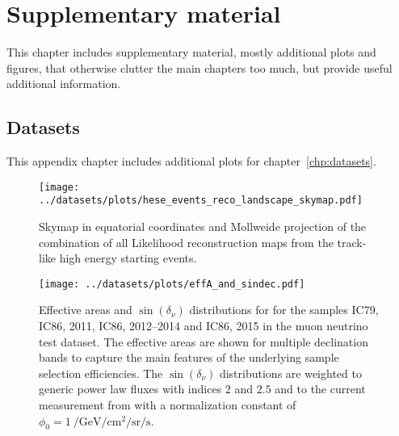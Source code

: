 \chapter{Supplementary material}
This chapter includes supplementary material, mostly additional plots and figures, that otherwise clutter the main chapters too much, but provide useful additional information.


\section{Datasets}
This appendix chapter includes additional plots for chapter~\ref{chp:datasets}.

\begin{figure}[H]
  \centering
  \texttt{[image: ../datasets/plots/hese\_events\_reco\_landscape\_skymap.pdf]}
  \caption[Combined Likelihood skymap of the 22 HESEs]{
    Skymap in equatorial coordinates and Mollweide projection of the combination of all Likelihood reconstruction maps from the track-like high energy starting events.
  }
  \label{fig:hese_events_reco_landscape_skymap}
\end{figure}

\begin{figure}[H]
  \centering
  \texttt{[image: ../datasets/plots/effA\_and\_sindec.pdf]}
  \caption[Effective areas and $\sin(\delta_\nu)$ distributions]{
    Effective areas and $\sin(\delta_\nu)$ distributions for for the samples IC79, IC86, 2011, IC86, 2012--2014 and IC86, 2015 in the muon neutrino test dataset.
    The effective areas are shown for multiple declination bands to capture the main features of the underlying sample selection efficiencies.
    The $\sin(\delta_\nu)$ distributions are weighted to generic power law fluxes with indices $2$ and $2.5$ and to the current measurement from \cite{Haack:2017dxi} with a normalization constant of $\phi_0 = \SI[per-mode=reciprocal]{1}{\per\GeV\per\cm\squared\per\steradian\per\second}$.
    }
  \label{fig:effA_and_sindec}
\end{figure}

